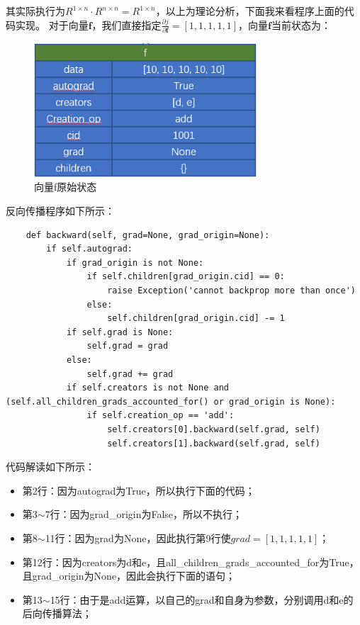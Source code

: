 其实际执行为$R^{1 \times n} \cdot R^{n \times n}=R^{1 \times n}$，以上为理论分析，下面我来看程序上面的代码实现。
对于向量$\boldsymbol{f}$，我们直接指定$\frac{\partial j}{\partial \boldsymbol{f}}=[1, 1, 1, 1, 1]$，向量$\boldsymbol{f}$当前状态为：
\begin{figure}[h]
	\caption{向量f原始状态}
	\label{p000017}
	\centering
	\includegraphics[height=5cm]{images/p000017}
\end{figure}
反向传播程序如下所示：
\begin{lstlisting}
    def backward(self, grad=None, grad_origin=None):
        if self.autograd:
            if grad_origin is not None:
                if self.children[grad_origin.cid] == 0:
                    raise Exception('cannot backprop more than once')
                else:
                    self.children[grad_origin.cid] -= 1
            if self.grad is None:
                self.grad = grad
            else:
                self.grad += grad
            if self.creators is not None and (self.all_children_grads_accounted_for() or grad_origin is None):
                if self.creation_op == 'add':
                    self.creators[0].backward(self.grad, self)
                    self.creators[1].backward(self.grad, self)
\end{lstlisting}
代码解读如下所示：
\begin{itemize}
	\item 第2行：因为autograd为True，所以执行下面的代码；
	\item 第3$\sim$7行：因为grad\_origin为False，所以不执行；
	\item 第8$\sim$11行：因为grad为None，因此执行第9行使$grad=[1, 1, 1, 1, 1]$；
	\item 第12行：因为creators为d和e，且all\_children\_grads\_accounted\_for为True，且grad\_origin为None，因此会执行下面的语句；
	\item 第13$\sim$15行：由于是add运算，以自己的grad和自身为参数，分别调用d和e的后向传播算法；
\end{itemize}
